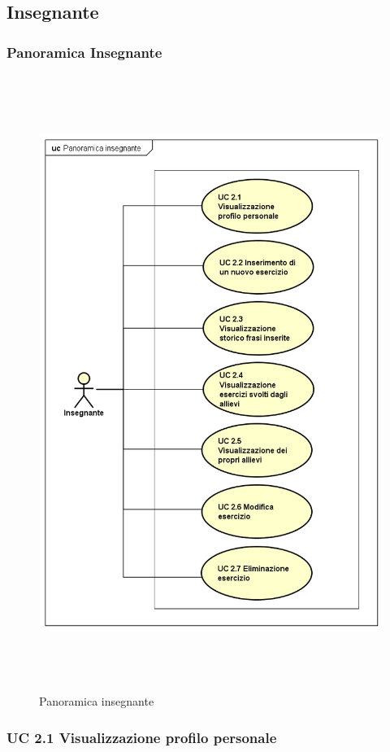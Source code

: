 
\subsection{Insegnante}

\subsubsection{Panoramica Insegnante}

\begin{figure}[H]
\centering
\includegraphics[width=17cm, height=20cm]{img/PanoramicaInsegnanti.png} 
\caption{Panoramica insegnante}
\end{figure}

\subsubsection{UC 2.1 Visualizzazione profilo personale}

